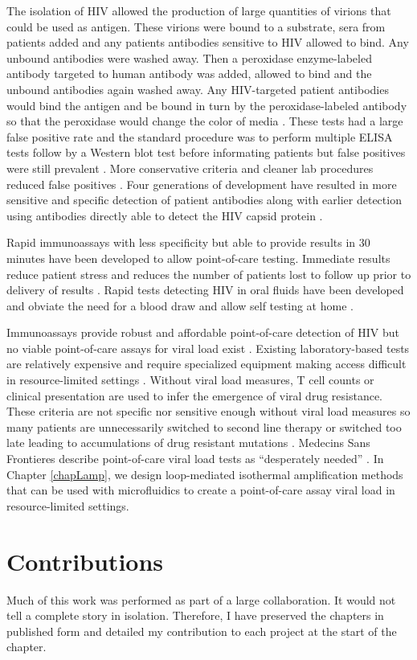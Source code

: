 \documentclass[../sherrill-Mix_thesis.tex]{subfiles}
\begin{document}
	  The isolation of HIV \citep{Barre-Sinoussi1983,Gallo1983,Popovic1984,Levy1984} allowed the production of large quantities of virions that could be used as antigen. These virions were bound to a substrate, sera from patients added and any patients antibodies sensitive to HIV allowed to bind. Any unbound antibodies were washed away. Then a peroxidase enzyme-labeled antibody targeted to human antibody was added, allowed to bind and the unbound antibodies again washed away. Any HIV-targeted patient antibodies would bind the antigen and be bound in turn by the peroxidase-labeled antibody so that the peroxidase would change the color of media \citep{Safai1984,Sarngadharan1984,Ward1986}. These tests had a large false positive rate and the standard procedure was to perform multiple ELISA tests follow by a Western blot test before informating patients \citep{Towbin1979,CDC1985} but false positives were still prevalent \citep{Burke1986}. More conservative criteria and cleaner lab procedures reduced false positives \citep{Burke1988}. Four generations of development \citep{Chappel2009} have resulted in more sensitive and specific detection of patient antibodies along with earlier detection using antibodies directly able to detect the HIV capsid protein \citep{Weber1998,Weber2002}.  

	Rapid immunoassays with less specificity but able to provide results in 30 minutes have been developed to allow point-of-care testing. Immediate results reduce patient stress and reduces the number of patients lost to follow up prior to delivery of results \citep{Kassler1995,CDCP1998,CDCP2002}. Rapid tests detecting HIV in oral fluids have been developed and obviate the need for a blood draw \citep{Gallo1997,Delaney2006,SemaBaltazar2014} and allow self testing at home \citep{Granade2004,PantPai2013}.


	Immunoassays provide robust and affordable point-of-care detection of HIV but no viable point-of-care assays for viral load exist \citep{Usdin2010}. Existing laboratory-based tests are relatively expensive and require specialized equipment making access difficult in resource-limited settings \citep{Fiscus2006,Wang2010a}. Without viral load measures, \cdFour{} T cell counts or clinical presentation are used to infer the emergence of viral drug resistance. These criteria are not specific nor sensitive enough without viral load measures so many patients are unnecessarily switched to second line therapy \citep{Mee2008,VanOosterhout2009} or switched too late leading to accumulations of drug resistant mutations \citep{Hosseinipour2009}. Medecins Sans Frontieres describe point-of-care viral load tests as ``desperately needed'' \citep{Usdin2010}. In Chapter \ref{chapLamp}, we design loop-mediated isothermal amplification methods that can be used with microfluidics to create a point-of-care assay viral load in resource-limited settings.

\section{Contributions}
	Much of this work was performed as part of a large collaboration. It would not tell a complete story in isolation. Therefore, I have preserved the chapters in published form and detailed my contribution to each project at the start of the chapter.
\end{document}
